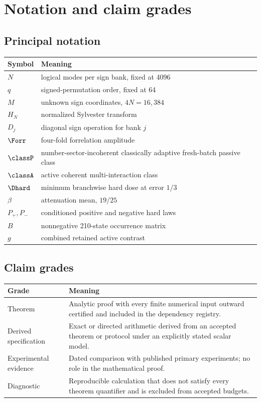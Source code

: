 \section{Notation and claim grades}
\label{app:notation}

\subsection{Principal notation}

\begin{center}
\small
\begin{tabular}{@{}lp{5.8cm}@{}}
\toprule
Symbol & Meaning \\
\midrule
$N$ & logical modes per sign bank, fixed at 4096 \\
$q$ & signed-permutation order, fixed at 64 \\
$M$ & unknown sign coordinates, $4N=16{,}384$ \\
$H_N$ & normalized Sylvester transform \\
$D_j$ & diagonal sign operation for bank $j$ \\
$\Forr$ & four-fold forrelation amplitude \\
$\classP$ & number-sector-incoherent classically adaptive fresh-batch passive class \\
$\classA$ & active coherent multi-interaction class \\
$\Dhard$ & minimum branchwise hard dose at error $1/3$ \\
$\beta$ & attenuation mean, $19/25$ \\
$P_+,P_-$ & conditioned positive and negative hard laws \\
$B$ & nonnegative 210-state occurrence matrix \\
$g$ & combined retained active contrast \\
\bottomrule
\end{tabular}
\end{center}

\subsection{Claim grades}

\begin{center}
\footnotesize
\begin{tabular}{lp{4.7cm}}
\toprule
Grade & Meaning \\
\midrule
Theorem & Analytic proof with every finite numerical input outward certified and included in the dependency registry. \\
Derived specification & Exact or directed arithmetic derived from an accepted theorem or protocol under an explicitly stated scalar model. \\
Experimental evidence & Dated comparison with published primary experiments; no role in the mathematical proof. \\
Diagnostic & Reproducible calculation that does not satisfy every theorem quantifier and is excluded from accepted budgets. \\
\bottomrule
\end{tabular}
\end{center}

